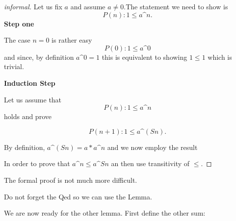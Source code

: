 \begin{proof}[informal]
Let us fix $a$ and assume $a \ne 0$.The statement we need to show is
$$P(n): 1\le a\mbox{\textasciicircum }{n}.$$
{\bf Step one}

The case $n=0$ is rather easy
$$P(0) : 1\le a\mbox{\textasciicircum }{0}$$  and  since, by definition $a\mbox{\textasciicircum }{0}=1$ this is equivalent to showing $1\le 1$ which is trivial.

{\bf Induction Step}

Let us assume that
$$P(n) : 1\le a\mbox{\textasciicircum }n$$ holds and prove

$$P(n+1): 1\le a\mbox{\textasciicircum }{(S n)}.$$

By definition, $a\mbox{\textasciicircum }{(S n)} = a* a\mbox{\textasciicircum }{n}$ and we now employ the result 

In order to prove that $a\mbox{\textasciicircum }{n}\le a\mbox{\textasciicircum }{S n}$ an then use transitivity of $\le$.

\end{proof}
The formal proof is not much more difficult.

Do not forget the Qed so we can use the Lemma.

We are now ready for the other lemma. First define the other sum:

